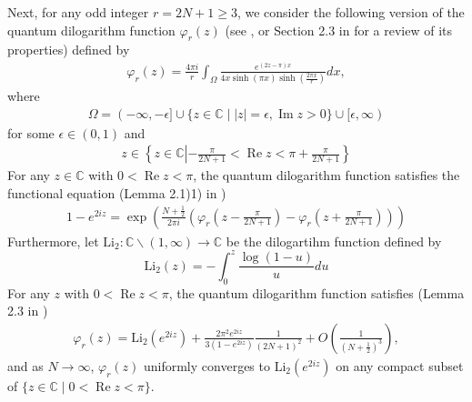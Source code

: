 \documentclass[10pt,a4paper]{article}
\newcommand{\lt}{\left}
\newcommand{\rt}{\right}
\def \CC{\mathbb C}
\def \Re{\operatorname{Re}}
\def\CC{{\mathbb C}}
\def \Re{\operatorname{Re}}
\def \im{\operatorname{Im}}
\def \Li{\operatorname{Li_2}}
\def \im{\operatorname{Im}}
\begin{document}
Next, for any odd integer $r=2N+1\geq 3$, we consider the following version of the quantum dilogarithm function $\varphi_r(z)$ (see \cite{F95, FKV01}, or Section 2.3 in \cite{WY20} for a review of its properties) defined by 
\begin{align*}
\varphi_r (z) = \frac{4\pi i}{r}\int_\Omega \frac{e^{(2z - \pi)x} }{4x \sinh(\pi x) \sinh (\frac{2\pi x}{r} )} dx,
\end{align*}
where 
\begin{align*}
\Omega = (-\infty, - \epsilon] \cup \{ z \in \CC \mid |z| = \epsilon, \im z >0\} \cup [ \epsilon, \infty)
\end{align*}
for some $\epsilon \in (0,1)$ and 
\begin{align*}
z \in \lt\{ z \in \CC \lt\vert - \frac{\pi}{2N+1} < \Re z < \pi + \frac{\pi}{2N+1}\rt. \rt\}
\end{align*}
For any $z \in \CC$ with $0 < \Re z < \pi$, the quantum dilogarithm function satisfies the functional equation (Lemma 2.1)1) in \cite{WY20})
\begin{align}
1 - e^{2i z} = \exp \lt(\frac{N+\frac{1}{2}}{2\pi i}\lt( \varphi_r \lt( z - \frac{\pi }{2N+1} \rt) - \varphi_r \lt( z + \frac{\pi }{2N+1} \rt) \rt)\rt)
\end{align}
Furthermore, let $\Li: \CC\backslash (1,\infty) \to \CC$ be the dilogartihm function defined by
$$ \Li(z) = - \int_0^z \frac{\log(1-u)}{u} du $$
For any $z$ with $0<\Re z < \pi$, the quantum dilogarithm function satisfies (Lemma 2.3 in \cite{WY20})
\begin{align}
\varphi_r (z) = \Li(e^{2iz}) + \frac{2\pi^2 e^{2iz}}{3(1-e^{2iz})} \frac{1}{(2N+1)^2} + O\lt(\frac{1}{(N+\frac{1}{2})^3}\rt) \label{QtoC},
\end{align}
and as $N \to \infty$, $\varphi_r(z)$ uniformly converges to $\Li(e^{2iz})$ on any compact subset of $\{z \in \CC \mid 0 < \Re z < \pi \}$.
\end{document}
